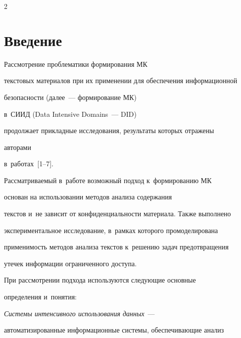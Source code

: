 \begin{multicols}{2}





\label{st\stat}





\section{Введение}





\vspace*{-2pt}





  Рассмотрение проблематики формирования МК


текстовых материалов при их применении для обеспечения информационной 


безопас\-ности (далее~--- формирование МК) 


в~СИИД (Data Intensive Domains~--- DID) 


продолжает прикладные исследования, результаты которых отражены 


авторами  


в~работах~[1--7].


   


  Рассматриваемый в~работе возможный подход к~формированию МК


   основан на использовании методов анализа содержания 


текстов и~не зависит от конфиденциальности материала. Также выполнено 


экспериментальное исследование, в~рамках которого промоделирована 


применимость методов анализа текстов к~решению задач предотвращения 


утечек информации ограниченного доступа.


  


  При рассмотрении подхода используются следующие основные 


определения и~понятия: 


  


  \textit{Системы интенсивного использования данных}~--- 


автоматизированные информационные системы, обеспечивающие анализ  



\end{multicols}
